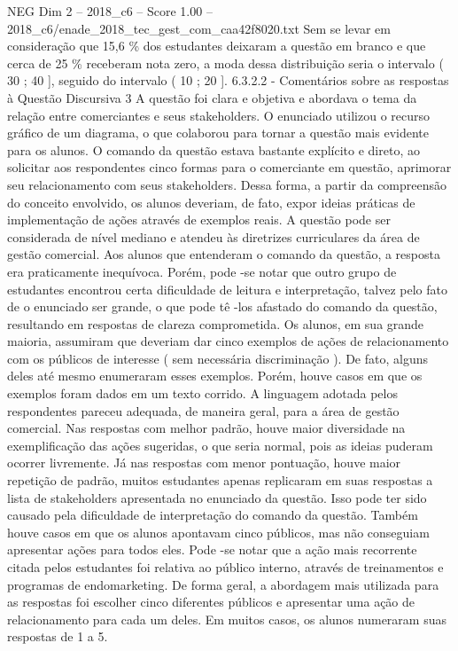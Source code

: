 \begin{textsample}{NEG Dim 2 – 2018\_c6 – Score 1.00 – 2018\_c6/enade\_2018\_tec\_gest\_com\_caa42f8020.txt}
Sem se levar em consideração que 15,6 \% dos estudantes deixaram a questão em branco e que cerca de 25 \% receberam nota zero, a moda dessa distribuição seria o intervalo ( 30 ; 40 ], seguido do intervalo ( 10 ; 20 ]. 6.3.2.2 - Comentários sobre as respostas à Questão Discursiva 3 A questão foi clara e objetiva e abordava o tema da relação entre comerciantes e seus stakeholders.
O enunciado utilizou o recurso gráfico de um diagrama, o que colaborou para tornar a questão mais evidente para os alunos.
O comando da questão estava bastante explícito e direto, ao solicitar aos respondentes cinco formas para o comerciante em questão, aprimorar seu relacionamento com seus stakeholders.
Dessa forma, a partir da compreensão do conceito envolvido, os alunos deveriam, de fato, expor ideias práticas de implementação de ações através de exemplos reais.
A questão pode ser considerada de nível mediano e atendeu às diretrizes curriculares da área de gestão comercial.
Aos alunos que entenderam o comando da questão, a resposta era praticamente inequívoca.
Porém, pode -se notar que outro grupo de estudantes encontrou certa dificuldade de leitura e interpretação, talvez pelo fato de o enunciado ser grande, o que pode tê -los afastado do comando da questão, resultando em respostas de clareza comprometida.
Os alunos, em sua grande maioria, assumiram que deveriam dar cinco exemplos de ações de relacionamento com os públicos de interesse ( sem necessária discriminação ).
De fato, alguns deles até mesmo enumeraram esses exemplos.
Porém, houve casos em que os exemplos foram dados em um texto corrido.
A linguagem adotada pelos respondentes pareceu adequada, de maneira geral, para a área de gestão comercial.
Nas respostas com melhor padrão, houve maior diversidade na exemplificação das ações sugeridas, o que seria normal, pois as ideias puderam ocorrer livremente.
Já nas respostas com menor pontuação, houve maior repetição de padrão, muitos estudantes apenas replicaram em suas respostas a lista de stakeholders apresentada no enunciado da questão.
Isso pode ter sido causado pela dificuldade de interpretação do comando da questão.
Também houve casos em que os alunos apontavam cinco públicos, mas não conseguiam apresentar ações para todos eles.
Pode -se notar que a ação mais recorrente citada pelos estudantes foi relativa ao público interno, através de treinamentos e programas de endomarketing.
De forma geral, a abordagem mais utilizada para as respostas foi escolher cinco diferentes públicos e apresentar uma ação de relacionamento para cada um deles.
Em muitos casos, os alunos numeraram suas respostas de 1 a 5.

\end{textsample}
